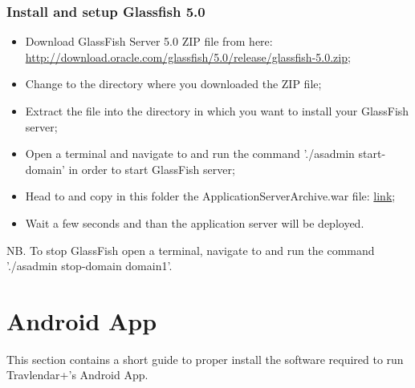 \subsubsection{Install and setup Glassfish 5.0}
\begin{itemize}
	\item Download GlassFish Server 5.0 ZIP file from here: \\ \href{http://download.oracle.com/glassfish/5.0/release/glassfish-5.0.zip}{\color{blue}http://download.oracle.com/glassfish/5.0/release/glassfish-5.0.zip};
	\item Change to the directory where you downloaded the ZIP file;
	\item Extract the file into the directory in which you want to install your GlassFish server;
	\item Open a terminal and navigate to  and run the command './asadmin start-domain' in order to start GlassFish server;
	\item Head to  and copy in this folder the ApplicationServerArchive.war file: \href{https://github.com/JustSalva/MelziPinaSalvadore/tree/master/DeliveryFolder/InstallationFolder}{\color{blue}link};
	\item Wait a few seconds and than the application server will be deployed.
\end{itemize}
NB. To stop GlassFish open a terminal, navigate to  and run the command './asadmin stop-domain domain1'.

\section{Android App}
\label{sect:Android App}
This section contains a short guide to proper install the software required to run Travlendar+'s Android App.

